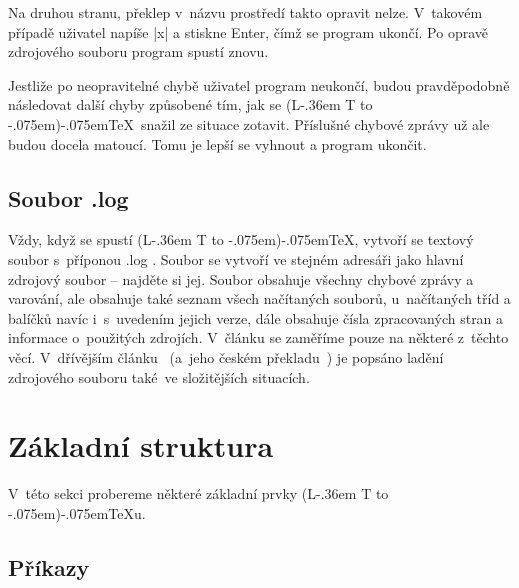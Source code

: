 \documentclass[oldcsbabel]{csbulletin}
\makeatletter
\def\soub#1{{\sffamily
  \tmphc\hyphenchar\font
  \hyphenchar\font-1 #1%
  \hyphenchar\font\tmphc}}
\DeclareRobustCommand{\La}{L\kern-.36em%
        {\sbox\z@ T%
         \vbox to\ht\z@{\hbox{\check@mathfonts
                              \fontsize\sf@size\z@
                              \math@fontsfalse\selectfont
                              A}%
                        \vss}%
        }}
\def\AllTeX{(\La\kern-.075em)\kern-.075em\TeX}
\makeatother
\begin{document}
Na druhou stranu, překlep v~názvu prostředí takto opravit nelze. V~takovém případě uživatel napíše |x| a stiskne Enter, čímž se program ukončí. Po opravě zdrojového souboru program spustí znovu.

Jestliže po neopravitelné chybě uživatel program neukončí, budou pravděpodobně následovat další chyby způsobené tím, jak se \AllTeX\ snažil ze situace zotavit. Příslušné chybové zprávy už ale budou docela matoucí. Tomu je lepší se vyhnout a program ukončit.

\subsection{Soubor \soub{.log}}

Vždy, když se spustí \AllTeX, vytvoří se textový soubor s~příponou \soub{.log}. Soubor se vytvoří ve stejném adresáři jako hlavní zdrojový soubor -- najděte si jej. Soubor obsahuje všechny chybové zprávy a varování, ale obsahuje také seznam všech načítaných souborů, u~načítaných tříd a balíčků navíc i~s~uvedením jejich verze, dále obsahuje čísla zpracovaných stran a informace o~použitých zdrojích. V~článku se zaměříme pouze na některé z~těchto věcí. V~dřívějším článku~\cite{debug} (a~jeho českém překladu~\cite{debugCZ}) je popsáno ladění zdrojového souboru také~ve složitějších situacích.


%
%

\section{Základní struktura}

V~této sekci probereme některé základní prvky \AllTeX u.

\subsection{Příkazy}
\end{document}

